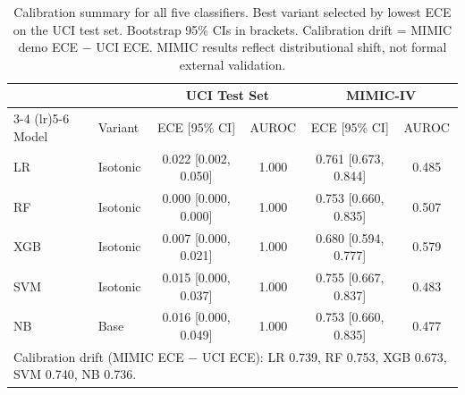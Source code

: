 \begin{table}[ht]
\centering
\caption{Calibration summary for all five classifiers. Best variant selected by lowest ECE on the UCI test set. Bootstrap 95\% CIs in brackets. Calibration drift = MIMIC demo ECE $-$ UCI ECE. MIMIC results reflect distributional shift, not formal external validation.}
\label{tab:t2}
\begin{tabular}{llcccc}
\toprule
 & & \multicolumn{2}{c}{UCI Test Set} & \multicolumn{2}{c}{MIMIC-IV} \\
\cmidrule(lr){3-4} \cmidrule(lr){5-6}
Model & Variant & ECE [95\% CI] & AUROC & ECE [95\% CI] & AUROC \\
\midrule
LR  & Isotonic & 0.022 [0.002, 0.050] & 1.000 & 0.761 [0.673, 0.844] & 0.485 \\
RF  & Isotonic & 0.000 [0.000, 0.000] & 1.000 & 0.753 [0.660, 0.835] & 0.507 \\
XGB & Isotonic & 0.007 [0.000, 0.021] & 1.000 & 0.680 [0.594, 0.777] & 0.579 \\
SVM & Isotonic & 0.015 [0.000, 0.037] & 1.000 & 0.755 [0.667, 0.837] & 0.483 \\
NB  & Base     & 0.016 [0.000, 0.049] & 1.000 & 0.753 [0.660, 0.835] & 0.477 \\
\midrule
\multicolumn{6}{l}{\footnotesize Calibration drift (MIMIC ECE $-$ UCI ECE): LR 0.739, RF 0.753, XGB 0.673, SVM 0.740, NB 0.736.}\\
\bottomrule
\end{tabular}
\end{table}

